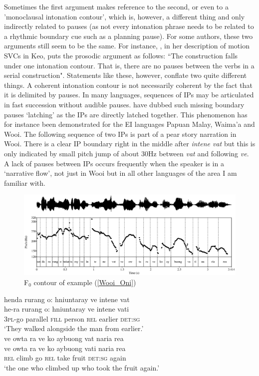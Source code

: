 Sometimes the first argument makes reference to the second, or even to a 'monoclausal intonation contour', which is, however, a different thing and only indirectly related to pauses (as not every intonation phrase needs to be related to a rhythmic boundary cue such as a planning pause). For some authors, these two arguments still seem to be the same. For instance, \citet[56]{baird2008motion}, in her description of motion SVCs in Keo, puts the prosodic argument as follows: ``The construction falls under one intonation contour. That is, there are no pauses between the verbs in a serial construction". Statements like these, however, conflate two quite different things. A coherent intonation contour is not necessarily coherent by the fact that it is delimited by pauses. In many languages, sequences of IPs may be articulated in fast succession without audible pauses. \citet{himmelmann2018} have dubbed such missing boundary pauses `latching' as the IPs are directly latched together. This phenomenon has for instance been demonstrated for the EI languages Papuan Malay, Waima'a and Wooi. The following sequence of two IPs is part of a pear story narration in Wooi. There is a clear IP boundary right in the middle after \textit{intene vat} but this is only indicated by small pitch jump of about 30Hz between \textit{vat} and following \textit{ve}. A lack of pauses between IPs occurs frequently when the speaker is in a `narrative flow', not just in Wooi but in all other languages of the area I am familiar with.

\begin{figure}
\includegraphics[width=\textwidth]{figures/pearOniLATCH.eps} 
\caption{F$_0$ contour of example (\ref{Wooi_Oni})}\label{fig:Wooi_Oni}
\end{figure}

\ea \label{Wooi_Oni}
\ea
\glll henda rurang o: hniuntaray ve intene vat \\
he-ra rurang o: hniuntaray ve intene vati \\
3\textsc{pl}-go parallel \textsc{fill} person \textsc{rel} earlier \textsc{det}:\textsc{sg} \\
\glft `They walked alongside the man from earlier.' \\ 
\ex
\glll ve owta ra ve ko aybuong vat naria rea \\ 
ve owta ra ve ko aybuong vati naria rea \\
\textsc{rel} climb go \textsc{rel} take fruit \textsc{det}:\textsc{sg} again  \\
\glft `the one who climbed up who took the fruit again.'\\ 
\z
\z

